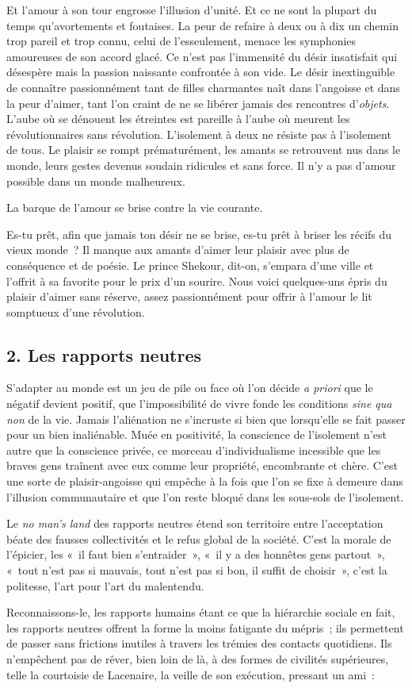 \documentclass[french,twoside]{book} %
\begin{document}
\noindent Et l’amour à son tour engrosse l’illusion d’unité. Et ce ne sont la plupart du temps qu’avortements et foutaises. La peur de refaire à deux ou à dix un chemin trop pareil et trop connu, celui de l’esseulement, menace les symphonies amoureuses de son accord glacé. Ce n’est pas l’immensité du désir insatisfait qui désespère mais la passion naissante confrontée à son vide. Le désir inextinguible de connaître passionnément tant de filles charmantes naît dans l’angoisse et dans la peur d’aimer, tant l’on craint de ne se libérer jamais des rencontres d’\emph{objets}. L’aube où se dénouent les étreintes est pareille à l’aube où meurent les révolutionnaires sans révolution. L’isolement à deux ne résiste pas à l’isolement de tous. Le plaisir se rompt prématurément, les amants se retrouvent nus dans le monde, leurs gestes devenus soudain ridicules et sans force. Il n’y a pas d’amour possible dans un monde malheureux.\par
La barque de l’amour se brise contre la vie courante.\par
Es-tu prêt, afin que jamais ton désir ne se brise, es-tu prêt à briser les récifs du vieux monde ? Il manque aux amants d’aimer leur plaisir avec plus de conséquence et de poésie. Le prince Shekour, dit-on, s’empara d’une ville et l’offrit à sa favorite pour le prix d’un sourire. Nous voici quelques-uns épris du plaisir d’aimer sans réserve, assez passionnément pour offrir à l’amour le lit somptueux d’une révolution.
\subsection[{2. Les rapports neutres}]{\textsc{2.} Les rapports neutres}
\noindent S’adapter au monde est un jeu de pile ou face où l’on décide \emph{a priori} que le négatif devient positif, que l’impossibilité de vivre fonde les conditions \emph{sine qua non} de la vie. Jamais l’aliénation ne s’incruste si bien que lorsqu’elle se fait passer pour un bien inaliénable. Muée en positivité, la conscience de l’isolement n’est autre que la conscience privée, ce morceau d’individualisme incessible que les braves gens traînent avec eux comme leur propriété, encombrante et chère. C’est une sorte de plaisir-angoisse qui empêche à la fois que l’on se fixe à demeure dans l’illusion communautaire et que l’on reste bloqué dans les sous-sols de l’isolement.\par
Le \emph{no man’s land} des rapports neutres étend son territoire entre l’acceptation béate des fausses collectivités et le refus global de la société. C’est la morale de l’épicier, les « il faut bien s’entraider », « il y a des honnêtes gens partout », « tout n’est pas si mauvais, tout n’est pas si bon, il suffit de choisir », c’est la politesse, l’art pour l’art du malentendu.\par
Reconnaissons-le, les rapports humains étant ce que la hiérarchie sociale en fait, les rapports neutres offrent la forme la moins fatigante du mépris ; ils permettent de passer sans frictions inutiles à travers les trémies des contacts quotidiens. Ils n’empêchent pas de rêver, bien loin de là, à des formes de civilités supérieures, telle la courtoisie de Lacenaire, la veille de son exécution, pressant un ami :\par
\end{document}
